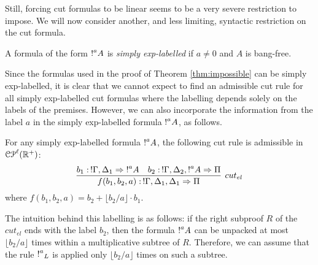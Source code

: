 Still, forcing cut formulas to be linear seems to be a very severe restriction to impose. We will now consider another, and less limiting, syntactic restriction on the cut formula. 

\begin{definition} A formula of the form $\hbox{$\mathop{!}^{a}$} A $ is \emph{simply exp-labelled} if $a\neq 0$ and $A$ is bang-free.
\end{definition}

Since the formulas used in the proof of Theorem \ref{thm:impossible} can be simply exp-labelled, it is clear that we cannot expect to find an admissible cut rule for all simply exp-labelled cut formulas where the labelling depends solely on the labels of the premises. However, we can also incorporate the information from the label $a$ in the simply exp-labelled formula $\hbox{$\mathop{!}^{a}$} A$, as follows.

%

\begin{theorem}\label{theorem:cut}
For any simply exp-labelled formula $\hbox{$\mathop{!}^{a}$} A $, the following cut rule is admissible in $\mathcal{CP}^\ell(\mathbb{R}^{+})$:
$$
\infer[cut_{el}]{f(b_1,b_2,a):\,!\Gamma,\Delta_1,\Delta_1\seq \Pi}{b_1:\,!\Gamma,\Delta_1\seq  \nbang{a} A  & b_2:\,!\Gamma,\Delta_2,\nbang{a} A \seq \Pi}
$$
where $f(b_1,b_2,a)=b_2+\lfloor b_2/a \rfloor\cdot b_1$.
\end{theorem}
The intuition behind this labelling is as follows: if the right subproof $R$ of the $cut_{el}$ ends with the label $b_2$, then the formula $\hbox{$\mathop{!}^{a}$} A$ can be unpacked at most $\lfloor b_2/a \rfloor$ times within a multiplicative subtree of $R$. Therefore, we can assume that the rule $\hbox{$\mathop{!}^{a}$}_L$ is applied only $\lfloor b_2/a \rfloor$ times on such a subtree.

